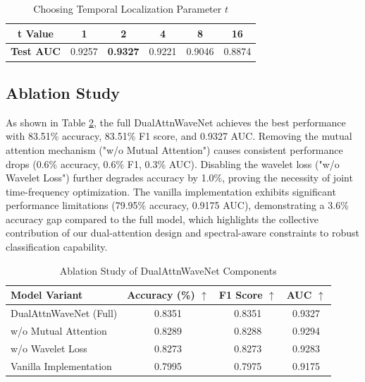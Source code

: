 \documentclass[conference]{IEEEtran}
\begin{document}
\begin{table}[t]
    \centering
    \caption{Choosing Temporal Localization Parameter $t$}
    \label{tab:experiment-results}
    \begin{tabular}{cccccc}
        \toprule
        \textbf{t Value} & 1 & 2 & 4 & 8 & 16 \\
        \midrule
        \textbf{Test AUC} & 0.9257 & \textbf{0.9327} & 0.9221 & 0.9046 & 0.8874 \\
        \bottomrule
    \end{tabular}
\end{table}




\subsection{Ablation Study}

As shown in Table \ref{tab:ablation}, the full DualAttnWaveNet achieves the best performance with 83.51\% accuracy, 83.51\% F1 score, and 0.9327 AUC. Removing the mutual attention mechanism ("w/o Mutual Attention") causes consistent performance drops (0.6\% accuracy, 0.6\% F1, 0.3\% AUC). Disabling the wavelet loss ("w/o Wavelet Loss") further degrades accuracy by 1.0\%, proving the necessity of joint time-frequency optimization. The vanilla implementation exhibits significant performance limitations (79.95\% accuracy, 0.9175 AUC), demonstrating a 3.6\% accuracy gap compared to the full model, which highlights the collective contribution of our dual-attention design and spectral-aware constraints to robust classification capability.

\begin{table}[t]
    \caption{Ablation Study of DualAttnWaveNet Components}
    \label{tab:ablation}
    \centering

    \begin{tabular}{lccc}
        \toprule
        \textbf{Model Variant} & \textbf{Accuracy (\%)} $\uparrow$ & \textbf{F1 Score} $\uparrow$ & \textbf{AUC} $\uparrow$ \\
        \midrule
        DualAttnWaveNet (Full) & 0.8351                            & 0.8351                       & 0.9327                  \\
        \cmidrule{1-4}
        w/o Mutual Attention   & 0.8289                            & 0.8288                       & 0.9294                  \\
        w/o Wavelet Loss       & 0.8273                            & 0.8273                       & 0.9283                  \\
        Vanilla Implementation & 0.7995                            & 0.7975                       & 0.9175                  \\
        \bottomrule
    \end{tabular}

\end{table}
\end{document}
